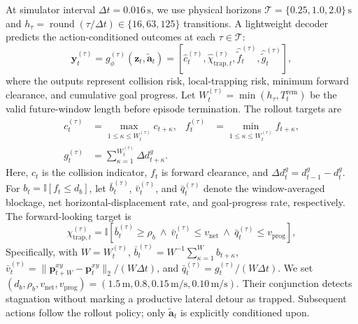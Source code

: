 \documentclass[letterpaper, 10 pt, conference]{ieeeconf}
\begin{document}
At simulator interval \(\Delta t=0.016\,\mathrm{s}\), we use physical horizons \(\mathcal{T}=\{0.25,1.0,2.0\}\,\mathrm{s}\) and \(h_\tau=\operatorname{round}(\tau/\Delta t)\in\{16,63,125\}\) transitions. A lightweight decoder predicts the action-conditioned outcomes at each \(\tau\in\mathcal{T}\):
\begin{equation}
	\hat{\mathbf{y}}_t^{(\tau)}
	=g_\phi^{(\tau)}(\mathbf{z}_t,\tilde{\mathbf{a}}_t)
	=\left[
		\hat{c}_t^{(\tau)},\hat{\chi}_{\mathrm{trap},t}^{(\tau)},
		\widehat{\tilde{f}}_t^{(\tau)},\widehat{\tilde{g}}_t^{(\tau)}
	\right],
	\label{eq:multi_horizon_prediction}
\end{equation}
where the outputs represent collision risk, local-trapping risk, minimum forward clearance, and cumulative goal progress. Let \(W_t^{(\tau)}=\min(h_\tau,T_t^{\mathrm{rem}})\) be the valid future-window length before episode termination. The rollout targets are
\begin{align}
	c_t^{(\tau)}&=\max_{1\leq\kappa\leq W_t^{(\tau)}}c_{t+\kappa},
	&
	f_t^{(\tau)}&=\min_{1\leq\kappa\leq W_t^{(\tau)}}f_{t+\kappa},
	\nonumber\\[-1mm]
	g_t^{(\tau)}&=\sum_{\kappa=1}^{W_t^{(\tau)}}\Delta d_{t+\kappa}^{g}.
	\label{eq:multi_horizon_targets}
\end{align}
Here, \(c_t\) is the collision indicator, \(f_t\) is forward clearance, and \(\Delta d_t^g=d_{t-1}^g-d_t^g\). For \(b_t=\mathbb{I}[f_t\leq d_b]\), let \(\bar b_t^{(\tau)}\), \(\bar v_t^{(\tau)}\), and \(\bar q_t^{(\tau)}\) denote the window-averaged blockage, net horizontal-displacement rate, and goal-progress rate, respectively. The forward-looking target is
\begin{equation}
	\chi_{\mathrm{trap},t}^{(\tau)}=\mathbb{I}\!\left[
	\bar b_t^{(\tau)}\!\geq\rho_b\ \land\
	\bar v_t^{(\tau)}\!\leq v_{\mathrm{net}}\ \land\
	\bar q_t^{(\tau)}\!\leq v_{\mathrm{prog}}\right],
	\label{eq:future_trapping_target}
\end{equation}
Specifically, with \(W=W_t^{(\tau)}\), \(\bar b_t^{(\tau)}=W^{-1}\sum_{\kappa=1}^{W}b_{t+\kappa}\), \(\bar v_t^{(\tau)}=\|\mathbf{p}_{t+W}^{xy}-\mathbf{p}_t^{xy}\|_2/(W\Delta t)\), and \(\bar q_t^{(\tau)}=g_t^{(\tau)}/(W\Delta t)\). We set \((d_b,\rho_b,v_{\mathrm{net}},v_{\mathrm{prog}})=(1.5\,\mathrm{m},0.8,0.15\,\mathrm{m/s},0.10\,\mathrm{m/s})\). Their conjunction detects stagnation without marking a productive lateral detour as trapped. Subsequent actions follow the rollout policy; only \(\tilde{\mathbf a}_t\) is explicitly conditioned upon.
\end{document}
